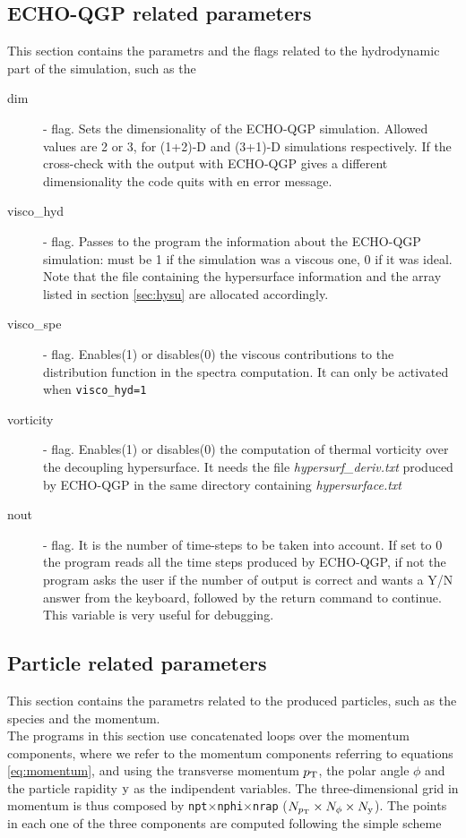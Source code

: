 \subsection{ECHO-QGP related parameters}
This section contains the parametrs and the flags related to the hydrodynamic part of the simulation, such as the 
\begin{description}
\item[dim] \integer - flag. Sets the dimensionality of the ECHO-QGP simulation. Allowed  values are 2 or 3, for (1+2)-D and (3+1)-D simulations respectively.
 If the cross-check with the output with ECHO-QGP gives a different 
 dimensionality the code quits with en error message.
\item[visco\_hyd]  \integer - flag. Passes to the program the information about the ECHO-QGP simulation: must be 1 if the simulation was a viscous one, 0 if it was ideal. Note that the file containing the hypersurface information and the array listed in section \ref{sec:hysu} are allocated accordingly.
\item[visco\_spe]  \integer - flag. 
Enables(1) or disables(0) the viscous contributions to the distribution function in the spectra computation. It can only be activated when {\tt visco\_hyd=1}
\item[vorticity]  \integer - flag. 
Enables(1) or disables(0) the computation of thermal vorticity over the decoupling hypersurface. It needs the file \textit{hypersurf\_deriv.txt} produced by ECHO-QGP in the same directory containing  \textit{hypersurface.txt}
\item[nout] \integer - flag. 
It is the number of time-steps to be taken into 
account. If set to 0 the program reads all the time steps produced by ECHO-QGP, if not the program asks the user if the number of output is correct and wants a Y/N answer from the keyboard, followed by the return command to continue. This variable is very useful for debugging.
\end{description}

\subsection{Particle related parameters}
This section contains the parametrs related to the produced particles, such as the species and the momentum.\\


The programs in this section use concatenated loops over the momentum components, 
where we refer to the momentum components referring to equations  \ref{eq:momentum}, and using 
the transverse momentum $p_\mathrm{T}$, the polar angle $\phi$ and the particle rapidity $\mathrm{y}$ as the indipendent variables.
The three-dimensional grid in momentum is  thus
composed by {\tt npt}$\times${\tt nphi}$\times${\tt nrap} 
($N_{p_\mathrm{T}} \times N_\phi \times N_{\mathrm{y}}$). The points in each 
one of the three components are computed following the simple scheme\\


